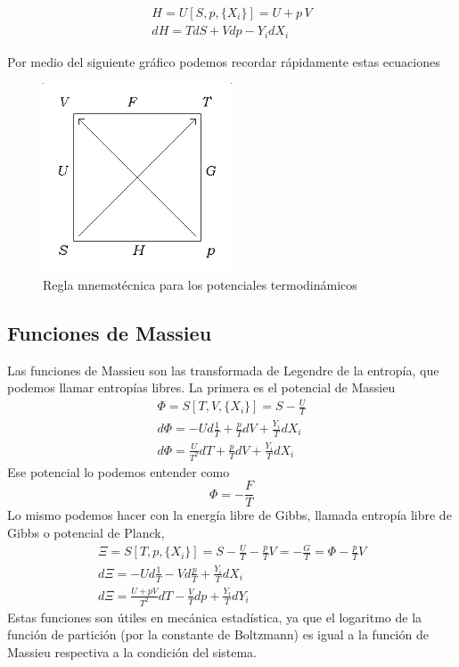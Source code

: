 \documentclass{book}
\numberwithin{equation}{section} %
\begin{document}
\begin{equation}
\begin{gathered}
H = U[S, p, \{X_i\}] = U + p\,V\\
dH = T dS + V dp - Y_i dX_i
\end{gathered}
\label{eq:entalpia}
\end{equation}

Por medio del siguiente gráfico podemos recordar rápidamente estas ecuaciones
\begin{figure}
\centering
\includegraphics[width=0.5\textwidth]{potenciales}
\caption{Regla mnemotécnica para los potenciales termodinámicos}
\label{fig:potenciales}
\end{figure}

\subsection{Funciones de Massieu}
Las funciones de Massieu son las transformada de Legendre de la entropía, que podemos llamar entropías libres.
La primera es el potencial de Massieu
\begin{equation}
\begin{gathered}
\Phi = S[T,V,\{X_i\}] = S - \frac{U}{T}\\
d\Phi = -U d\frac{1}{T} + \frac{p}{T} dV + \frac{Y_i}{T} dX_i\\
d\Phi = \frac{U}{T^2} dT + \frac{p}{T} dV + \frac{Y_i}{T} dX_i
\end{gathered}
\end{equation}
Ese potencial lo podemos entender como
\begin{equation}
\Phi = - \frac{F}{T}
\end{equation}
Lo mismo podemos hacer con la energía libre de Gibbs, llamada entropía libre de Gibbs o potencial de Planck,
\begin{equation}
\begin{gathered}
\Xi = S[T,p,\{X_i\}] = S - \frac{U}{T} - \frac{p}{T} V = - \frac{G}{T} = \Phi - \frac{p}{T} V\\
d\Xi = -U d\frac{1}{T} - V d\frac{p}{T} + \frac{Y_i}{T} dX_i\\
d\Xi = \frac{U + p V}{T^2} dT - \frac{V}{T} dp + \frac{Y_i}{T} dY_i
\end{gathered}
\end{equation}
Estas funciones son útiles en mecánica estadística, ya que el logaritmo de la función de partición (por la constante de Boltzmann) es igual a la función de Massieu respectiva a la condición del sistema.
\end{document}
